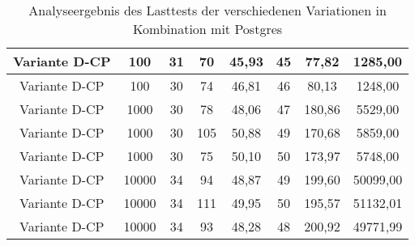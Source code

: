 \begin{landscape}
\begin{table}[h!]
\begin{tabular}{ |c|c|c|c|c|c|c|c|}
			\hline
			Variante D-CP & 100 & 31 & 70 & 45,93 & 45 & 77,82 & 1285,00 \\
			\hline
			Variante D-CP & 100 & 30 & 74 & 46,81 & 46 & 80,13 & 1248,00 \\
			\hline
			Variante D-CP & 1000 & 30 & 78 & 48,06 & 47 & 180,86 & 5529,00 \\
			\hline
			Variante D-CP & 1000 & 30 & 105 & 50,88 & 49 & 170,68 & 5859,00 \\
			\hline
			Variante D-CP & 1000 & 30 & 75 & 50,10 & 50 & 173,97 & 5748,00 \\
			\hline
			Variante D-CP & 10000 & 34 & 94 & 48,87 & 49 & 199,60 & 50099,00 \\
			\hline
			Variante D-CP & 10000 & 34 & 111 & 49,95 & 50 & 195,57 & 51132,01 \\
			\hline
			Variante D-CP & 10000 & 34 & 93 & 48,28 & 48 & 200,92 & 49771,99 \\
			\hline
		\end{tabular}
		\caption{Analyseergebnis des Lasttests der verschiedenen Variationen in Kombination mit Postgres}
		\label{fig:performance-postgres}
	\end{table}
\end{landscape}

